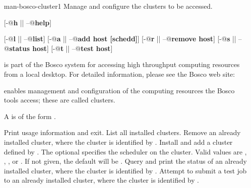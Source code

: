 \begin{ManPage}{}{man-bosco-cluster}{1}
{Manage and configure the clusters to be accessed. }


\Synopsis {}
[\verb@-@\textbf{h} || \verb@--@\textbf{help}]

[\verb@-@\textbf{l} || \verb@--@\textbf{list}]
[\verb@-@\textbf{a} || \verb@--@\textbf{add \lt{}host\gt{} [schedd]}]
[\verb@-@\textbf{r} || \verb@--@\textbf{remove \lt{}host\gt{}}]
[\verb@-@\textbf{s} || \verb@--@\textbf{status \lt{}host\gt{}}]
[\verb@-@\textbf{t} || \verb@--@\textbf{test \lt{}host\gt{}}]

\Description

 is part of the Bosco system for accessing high
throughput computing resources from a local desktop.
For detailed information, please see the Bosco web site:

 enables management and configuration of the computing resources
the Bosco tools access; these are called clusters.

A  is of the form .

\begin{Options}
   {Print usage information and exit.}
   {List all installed clusters.}
   {Remove an already installed cluster,
    where the cluster is identified by .}
    {Install and add a cluster defined by .
    The optional  specifies the scheduler on the cluster.
    Valid values are , , ,  or
    .  If not given, the default will be . }
   {Query and print the status of
    an already installed cluster,
    where the cluster is identified by .}
   {Attempt to submit a test job to 
    an already installed cluster,
    where the cluster is identified by .}

\end{Options}



\end{ManPage}
